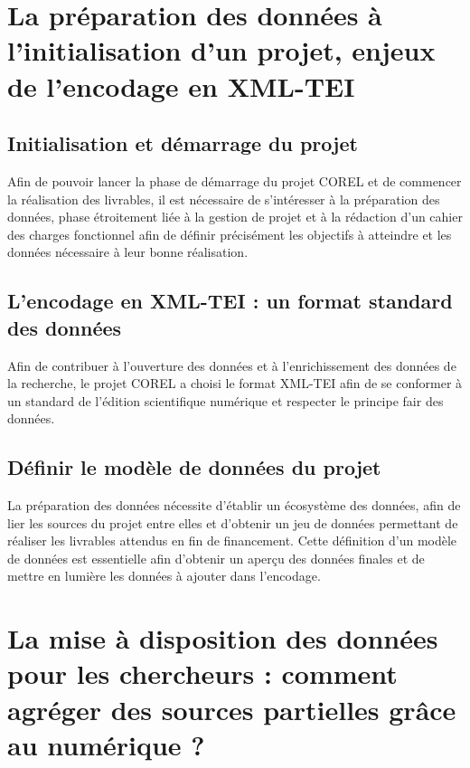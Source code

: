 \documentclass[a4paper,12pt,twoside]{book}
\newcommand{\fair}{\gls{fair}\xspace}
\newcommand{\COREL}{\gls{COREL}\xspace}
\newcommand{\XML}{\gls{XML}\xspace}
\newcommand{\TEI}{\gls{TEI}\xspace}
\newcommand{\clearemptydoublepage}{\newpage{\pagestyle{empty}\cleardoublepage}}
\begin{document}
        \clearemptydoublepage


    \part{La préparation des données à l’initialisation d’un projet, enjeux de l’encodage en XML-TEI}
        \chapter{Initialisation et démarrage du projet}
        Afin de pouvoir lancer la phase de démarrage du projet \COREL et de commencer la réalisation des livrables, il est nécessaire de s'intéresser à la préparation des données, phase étroitement liée à la gestion de projet et à la rédaction d'un cahier des charges fonctionnel afin de définir précisément les objectifs à atteindre et les données nécessaire à leur bonne réalisation.
                    
            
        \clearemptydoublepage
        
        \chapter{L’encodage en XML-TEI : un format standard des données}
        Afin de contribuer à l'ouverture des données et à l'enrichissement des données de la recherche, le projet \COREL a choisi le format \XML-\TEI afin de se conformer à un standard de l'édition scientifique numérique et respecter le principe \fair des données.
                    
             
            
        \clearemptydoublepage
        
        \chapter{Définir le modèle de données du projet}
        La préparation des données nécessite d'établir un écosystème des données, afin de lier les sources du projet entre elles et d'obtenir un jeu de données permettant de réaliser les livrables attendus en fin de financement. Cette définition d'un modèle de données est essentielle afin d'obtenir un aperçu des données finales et de mettre en lumière les données à ajouter dans l'encodage.
                    
             
            
        \clearemptydoublepage

    \part{La mise à disposition des données pour les chercheurs : comment agréger des sources partielles grâce au numérique ?}
\end{document}
